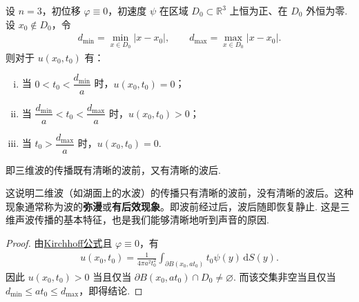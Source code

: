 \documentclass[../../main.tex]{subfiles}%
\begin{document}
\begin{proposition}[三维 Huygens 原理]
设 $n=3$，初位移 $\varphi\equiv 0$，初速度 $\psi$ 在区域 $D_0\subset\mathbb{R}^3$ 上恒为正、在 $D_0$ 外恒为零. 设 $x_0\notin D_0$，令
\begin{align*}
d_{\min}=\min_{x\in D_0}|x-x_0|,\qquad d_{\max}=\max_{x\in D_0}|x-x_0|.
\end{align*}
则对于 $u(x_0,t_0)$ 有：
\begin{enumerate}[(i)]
\item 当 $0<t_0<\dfrac{d_{\min}}{a}$ 时，$u(x_0,t_0)=0$；
\item 当 $\dfrac{d_{\min}}{a}<t_0<\dfrac{d_{\max}}{a}$ 时，$u(x_0,t_0)>0$；
\item 当 $t_0>\dfrac{d_{\max}}{a}$ 时，$u(x_0,t_0)=0$.
\end{enumerate}
即三维波的传播既有清晰的波前，又有清晰的波后.
\end{proposition}
\begin{remark}
这说明二维波（如湖面上的水波）的传播只有清晰的波前，没有清晰的波后。这种现象通常称为波的\textbf{弥漫}或\textbf{有后效现象}。即波前经过后，波后随即恢复静止. 这是三维声波传播的基本特征，也是我们能够清晰地听到声音的原因.
\end{remark}
\begin{proof}
由\hyperref[theorem:PDE-Kirchhoff公式]{Kirchhoff公式}且 $\varphi\equiv 0$，有
\begin{align*}
u(x_0,t_0)=\frac{1}{4\pi a^2t_0^2}\int_{\partial B(x_0,at_0)}t_0\psi(y)\,\mathrm{d}S(y).
\end{align*}
因此 $u(x_0,t_0)>0$ 当且仅当 $\partial B(x_0,at_0)\cap D_0\neq\varnothing$. 而该交集非空当且仅当 $d_{\min}\leqslant at_0\leqslant d_{\max}$，即得结论.
\end{proof}
\end{document}
